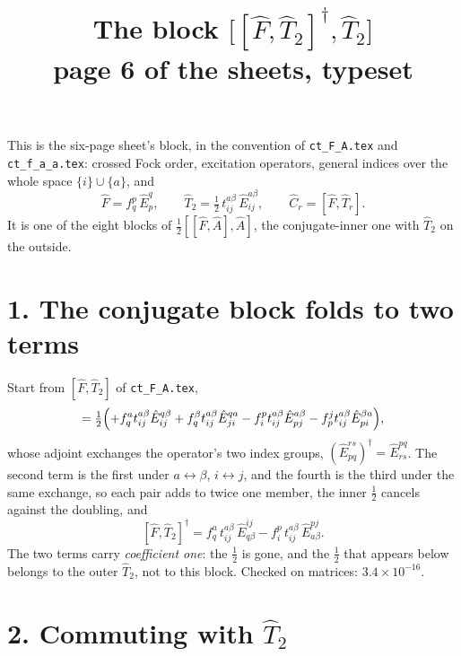 \documentclass[11pt]{article}
\title{\bfseries The block $\bigl[[\hat F,\hat T_2]^\dagger,\hat T_2\bigr]$\\[4pt]
       \large page 6 of the sheets, typeset}
\author{}
\date{}
\newcommand{\E}[2]{\hat E^{#1}_{#2}}
\newcommand{\occ}{i}
\newcommand{\vir}{a}
\begin{document}
\maketitle
\vspace{-2.5em}

\noindent
This is the six-page sheet's block, in the convention of
\texttt{ct\_F\_A.tex} and \texttt{ct\_f\_a\_a.tex}: crossed Fock order,
excitation operators, general indices over the whole space
$\{\occ\}\cup\{\vir\}$, and
\begin{equation}
  \hat F=f^p_q\,\E{q}{p},
  \qquad
  \hat T_2=\tfrac12\,t^{\vir\beta}_{\occ j}\,\E{\vir\beta}{\occ j},
  \qquad
  \hat C_r=[\hat F,\hat T_r].
  \label{eq:ops}
\end{equation}
It is one of the eight blocks of $\tfrac12[[\hat F,\hat A],\hat A]$, the
conjugate-inner one with $\hat T_2$ on the outside.

\section*{1. The conjugate block folds to two terms}

Start from $[\hat F,\hat T_2]$ of \texttt{ct\_F\_A.tex},
\begin{equation}
  [\hat F,\hat T_2]=\tfrac12\Bigl(
   +f^\vir_q t^{\vir\beta}_{\occ j}\E{q\beta}{\occ j}
   +f^\beta_q t^{\vir\beta}_{\occ j}\E{q\vir}{j\occ}
   -f^p_\occ t^{\vir\beta}_{\occ j}\E{\vir\beta}{pj}
   -f^j_p t^{\vir\beta}_{\occ j}\E{\beta\vir}{p\occ}\Bigr),
  \label{eq:FT2}
\end{equation}
whose adjoint exchanges the operator's two index groups,
$(\E{rs}{pq})^\dagger=\E{pq}{rs}$. The second term is the first under
$\vir\leftrightarrow\beta$, $\occ\leftrightarrow j$, and the fourth is the
third under the same exchange, so each pair adds to twice one member, the inner
$\tfrac12$ cancels against the doubling, and
\begin{equation}
  \boxed{\;[\hat F,\hat T_2]^\dagger
   =f^\vir_q\,t^{\vir\beta}_{\occ j}\,\E{\occ j}{q\beta}
    -f^p_\occ\,t^{\vir\beta}_{\occ j}\,\E{pj}{\vir\beta}.\;}
  \label{eq:C2dag}
\end{equation}
The two terms carry \emph{coefficient one}: the $\tfrac12$ is gone, and the
$\tfrac12$ that appears below belongs to the outer $\hat T_2$, not to this
block. Checked on matrices: $3.4\times10^{-16}$.

\section*{2. Commuting with \texorpdfstring{$\hat T_2$}{T2}}
\end{document}
